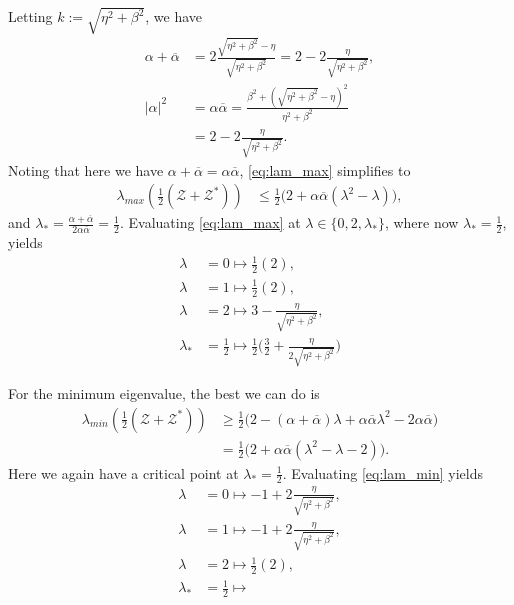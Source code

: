 \documentclass[a4paper,10pt]{article}
\begin{document}
Letting $k := \sqrt{\eta^2+\beta^2}$, we have
%
\begin{align*}
\alpha + \overline{\alpha} & = 2\frac{\sqrt{\eta^2+\beta^2} - \eta}{\sqrt{\eta^2+\beta^2}}
	= 2 - 2\frac{\eta}{\sqrt{\eta^2+\beta^2}}, \\
|\alpha|^2 & = \alpha\overline{\alpha} = \frac{\beta^2 + \left(\sqrt{\eta^2+\beta^2} - \eta\right)^2}{\eta^2+\beta^2} \\
& = 2 - 2\frac{\eta}{\sqrt{\eta^2+\beta^2}}.
\end{align*}
%
Noting that here we have $\alpha + \overline{\alpha} = \alpha\overline{\alpha}$, 
\eqref{eq:lam_max} simplifies to
%
\begin{align*}
\lambda_{max}\left(\frac{1}{2}(\mathcal{Z} + \mathcal{Z}^*)\right) & \leq 
	\frac{1}{2}\Big(2 + \alpha \overline{\alpha}(\lambda^2 - \lambda)\Big),
\end{align*}
%
and $\lambda_* = \frac{\alpha + \overline{\alpha}}{2\alpha\overline{\alpha}} = \frac{1}{2}$.
Evaluating \eqref{eq:lam_max} at $\lambda\in\{0,2,\lambda_*\}$, where now
$\lambda_* = \tfrac{1}{2}$, yields
%
\begin{align*}
\lambda & = 0 \mapsto \frac{1}{2}(2), \\
\lambda & = 1 \mapsto \frac{1}{2}(2), \\
\lambda & = 2 \mapsto 3 - \frac{\eta}{\sqrt{\eta^2+\beta^2}}, \\
\lambda_* & = \frac{1}{2} \mapsto \frac{1}{2}\Big(\frac{3}{2} + \frac{\eta}{2\sqrt{\eta^2+\beta^2}} \Big)
\end{align*}
%

For the minimum eigenvalue, the best we can do is
%
\begin{align}
\lambda_{min}\left(\frac{1}{2}(\mathcal{Z} + \mathcal{Z}^*)\right) & \geq 
	\frac{1}{2}\Big(2 - (\alpha + \overline{\alpha})\lambda +
		\alpha\overline{\alpha}\lambda^2 - 2\alpha\overline{\alpha}\Big) \nonumber\\
& = \frac{1}{2}\Big(2 + \alpha\overline{\alpha}(\lambda^2 - \lambda - 2)\Big).\label{eq:lam_min}
\end{align}
%
Here we again have a critical point at $\lambda_* = \tfrac{1}{2}$. Evaluating
\eqref{eq:lam_min} yields
%
\begin{align*}
\lambda & = 0 \mapsto -1 + 2\frac{\eta}{\sqrt{\eta^2+\beta^2}}, \\
\lambda & = 1 \mapsto -1 + 2\frac{\eta}{\sqrt{\eta^2+\beta^2}}, \\
\lambda & = 2 \mapsto \frac{1}{2}(2), \\
\lambda_* & = \frac{1}{2} \mapsto 
\end{align*}
%
\end{document}
